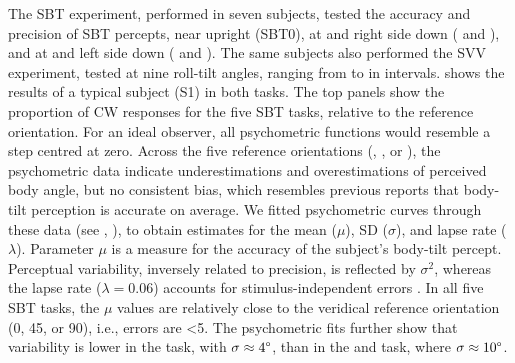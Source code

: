 The SBT experiment, performed in seven subjects, tested the accuracy and precision of SBT percepts, near upright (SBT0), at  and  right side down ( and ), and at  and  left side down ( and ). The same subjects also performed the SVV experiment, tested at nine roll-tilt angles, ranging from  to  in  intervals.  shows the results of a typical subject (S1) in both tasks. The top panels show the proportion of CW responses for the five SBT tasks, relative to the reference orientation. For an ideal observer, all psychometric functions would resemble a step centred at zero. Across the five reference orientations (, , or ), the psychometric data indicate underestimations and overestimations of perceived body angle, but no consistent bias, which resembles previous reports \cite{mittelstaedt1983, mast1996, jarchow1999, vanbeuzekom2001} that body-tilt perception is accurate on average. We fitted psychometric curves through these data (see , ), to obtain estimates for the mean ($\mu$), SD ($\sigma$), and lapse rate ($\lambda$). Parameter $\mu$ is a measure for the accuracy of the subject's body-tilt percept. Perceptual variability, inversely related to precision, is reflected by $\sigma^2$, whereas the lapse rate ($\lambda = 0.06$) accounts for stimulus-independent errors \cite{wichmann2001}. In all five SBT tasks, the $\mu$ values are relatively close to the veridical reference orientation (0\textdegree, 45\textdegree, or 90\textdegree), i.e., errors are \textless5\textdegree. The psychometric fits further show that variability is lower in the  task, with $\sigma \approx 4\degree$, than in the  and  task, where $\sigma \approx 10\degree$.

